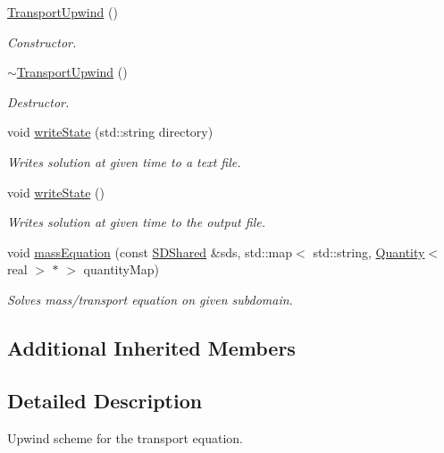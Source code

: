 \begin{DoxyCompactItemize}
\hyperlink{classTransportUpwind_add9a1d8fbb788ea5612d93634c79a8b9}{Transport\+Upwind} ()
\begin{DoxyCompactList}\small\item\em Constructor. \end{DoxyCompactList}\item 
\mbox{\label{classTransportUpwind_a05c9e8da697dfc51a2b8c3cfd19c2545}} 
\hyperlink{classTransportUpwind_a05c9e8da697dfc51a2b8c3cfd19c2545}{$\sim$\+Transport\+Upwind} ()
\begin{DoxyCompactList}\small\item\em Destructor. \end{DoxyCompactList}\item 
void \hyperlink{classTransportUpwind_a6eb3dea8ecfa8441e56b0c0f8f787377}{write\+State} (std\+::string directory)
\begin{DoxyCompactList}\small\item\em Writes solution at given time to a text file. \end{DoxyCompactList}\item 
void \hyperlink{classTransportUpwind_aad7f9cd10acf49402a6a4fe039669a34}{write\+State} ()
\begin{DoxyCompactList}\small\item\em Writes solution at given time to the output file. \end{DoxyCompactList}\item 
void \hyperlink{classTransportUpwind_a1a59087c829238f58f028a544269be54}{mass\+Equation} (const \hyperlink{classSDShared}{S\+D\+Shared} \&sds, std\+::map$<$ std\+::string, \hyperlink{classQuantity}{Quantity}$<$ real $>$ $\ast$ $>$ quantity\+Map)
\begin{DoxyCompactList}\small\item\em Solves mass/transport equation on given subdomain. \end{DoxyCompactList}\end{DoxyCompactItemize}
\subsection*{Additional Inherited Members}


\subsection{Detailed Description}
Upwind scheme for the transport equation. 

